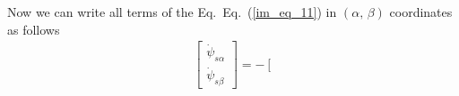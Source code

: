 \documentclass[11pt,a4paper]{scrartcl}
\numberwithin{equation}{section}
\theoremstyle{it}
\theoremstyle{definition}
\renewcommand{\eqref}[1]{Eq.~(\ref{#1})}
\begin{document}
\begin{onehalfspace}
Now we can write all terms of the Eq.~\eqref{im_eq_11} in $(\alpha,\,\beta)$ 
coordinates as follows
\begin{equation} \label{im_eq_20}
	\begin{aligned}
		&\left[
		\begin{matrix}
			\dot{\psi}_{s\alpha} \\[6pt]
			\dot{\psi}_{s\beta}
		\end{matrix} \right] = -
		\left[
		\begin{matrix}

\end{matrix}
\end{aligned}
\end{equation}
\end{onehalfspace}
\end{document}
